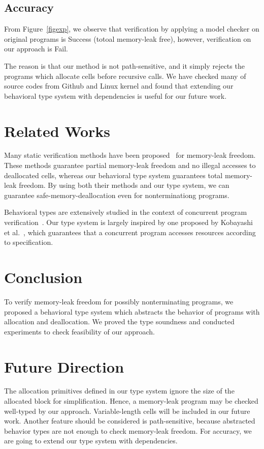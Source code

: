 \documentclass{sigplanconf}
\begin{document}
\subsection{Accuracy}
From Figure~\ref{figexp}, we observe that verification by applying a
model checker on original programs is Success (totoal memory-leak
free), however, verification on our approach is Fail.

The reason is that our method is not path-sensitive, and it simply
rejects the programs which allocate cells before recursive calls. We
have checked many of source codes from Github and Linux kernel and
found that extending our behavioral type system with dependencies is
useful for our future work.

\section{Related Works}
Many static verification methods have been
proposed~\cite{DBLP:conf/aplas/SuenagaK09,DBLP:conf/pldi/HeineL03,DBLP:conf/sigsoft/XieA05,DBLP:journals/scp/SwamyHMGJ06,DBLP:conf/sas/OrlovichR06,DBLP:conf/issta/SuiYX12}
for memory-leak freedom. These methods guarantee partial memory-leak
freedom and no illegal accesses to deallocated cells, whereas our
behavioral type system guarantees total memory-leak freedom. By using
both their methods and our type system, we can guarantee
safe-memory-deallocation even for nonterminationg programs.

Behavioral types are extensively studied in the context of concurrent
program
verification~\cite{DBLP:conf/esop/HondaVK98,DBLP:journals/tcs/IgarashiK04,DBLP:conf/esop/VieiraCS08,DBLP:journals/lmcs/KobayashiSW06}.
Our type system is largely inspired by one proposed by Kobayashi et
al.~\cite{DBLP:journals/lmcs/KobayashiSW06}, which guarantees that a
concurrent program accesses resources according to specification.

\section{Conclusion}
To verify memory-leak freedom for possibly nonterminating programs, we
proposed a behavioral type system which abstracts the behavior of
programs with allocation and deallocation. We proved the type
soundness and conducted experiments to check feasibility
of our approach.

\section{Future Direction}
The allocation primitives defined in our type system ignore the size
of the allocated block for simplification.  Hence, a memory-leak
program may be checked well-typed by our approach.  Variable-length
cells will be included in our future work.  Another feature should be
considered is path-sensitive, because abstracted behavior types are
not enough to check memory-leak freedom. For accuracy, we are going to
extend our type system with dependencies.




\end{document}
